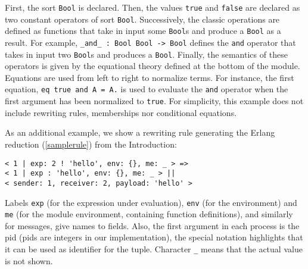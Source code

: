\documentclass{article}[12pt,a4paper]
\theoremstyle{definition}
\begin{document}
First, the sort \verb+Bool+ is declared. Then, the values \verb+true+ and \verb+false+ are declared
as two constant operators of sort \verb+Bool+. Successively, the classic operations are
defined as functions that take in input some \verb+Bool+s and produce a \verb+Bool+ as a
result. For example, \verb+_and_ : Bool Bool -> Bool+ defines the \verb+and+
operator that takes in input two \verb+Bool+s and produces a \verb+Bool+. Finally, the semantics of these operators is given
by the equational theory defined at the bottom of the module. Equations are used
from left to right to normalize terms. For instance, the first equation,
\verb+eq true and A = A.+ is used to evaluate the \verb+and+ operator when the first
argument has been normalized to \verb+true+. For simplicity, this example does not include rewriting rules, memberships nor conditional equations.

As an additional example, we show a rewriting rule generating the
Erlang reduction (\ref{samplerule}) from the Introduction:

\begin{Verbatim}
< 1 | exp: 2 ! 'hello', env: {}, me: _ > => 
< 1 | exp : 'hello', env: {}, me: _ > ||
< sender: 1, receiver: 2, payload: 'hello' >
\end{Verbatim}
Labels \verb|exp| (for the expression under evaluation), \verb|env| (for the environment) and \verb|me| (for the module environment, containing function definitions), and similarly for
messages, give names to fields. Also, the first argument in each
process is the pid (pids are integers in our implementation),
the special notation highlights that it can be used as identifier for
the tuple. Character \verb|_| means that the actual value is not shown.

  

\end{document}
